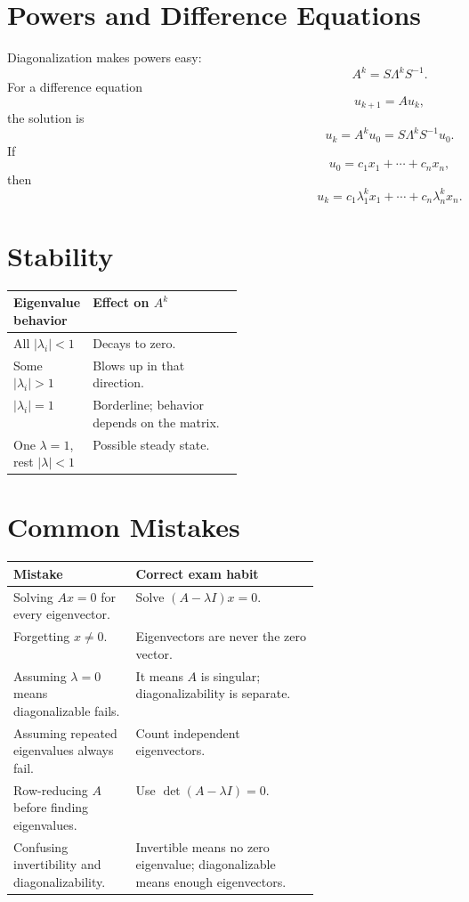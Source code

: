 \documentclass[10pt]{article}
\begin{document}

\section{Powers and Difference Equations}

Diagonalization makes powers easy:
\[
A^{k}=S\Lambda^{k}S^{-1}.
\]
For a difference equation
\[
u_{k+1}=Au_k,
\]
the solution is
\[
u_k=A^ku_0=S\Lambda^kS^{-1}u_0.
\]
If
\[
u_0=c_1x_1+\cdots+c_nx_n,
\]
then
\[
u_k=c_1\lambda_1^kx_1+\cdots+c_n\lambda_n^kx_n.
\]

\section{Stability}

\begin{center}
\small
\begin{tabularx}{\linewidth}{@{}L{0.30\linewidth}Y@{}}
\toprule
Eigenvalue behavior & Effect on \(A^k\) \\
\midrule
All \(|\lambda_i|<1\) & Decays to zero. \\
Some \(|\lambda_i|>1\) & Blows up in that direction. \\
\(|\lambda_i|=1\) & Borderline; behavior depends on the matrix. \\
One \(\lambda=1\), rest \(|\lambda|<1\) & Possible steady state. \\
\bottomrule
\end{tabularx}
\end{center}

\section{Common Mistakes}

\begin{center}
\small
\begin{tabularx}{\linewidth}{@{}L{0.40\linewidth}Y@{}}
\toprule
Mistake & Correct exam habit \\
\midrule
Solving \(Ax=0\) for every eigenvector. & Solve \((A-\lambda I)x=0\). \\
Forgetting \(x\ne0\). & Eigenvectors are never the zero vector. \\
Assuming \(\lambda=0\) means diagonalizable fails. & It means \(A\) is singular; diagonalizability is separate. \\
Assuming repeated eigenvalues always fail. & Count independent eigenvectors. \\
Row-reducing \(A\) before finding eigenvalues. & Use \(\det(A-\lambda I)=0\). \\
Confusing invertibility and diagonalizability. & Invertible means no zero eigenvalue; diagonalizable means enough eigenvectors. \\
\bottomrule
\end{tabularx}
\end{center}
\end{document}
